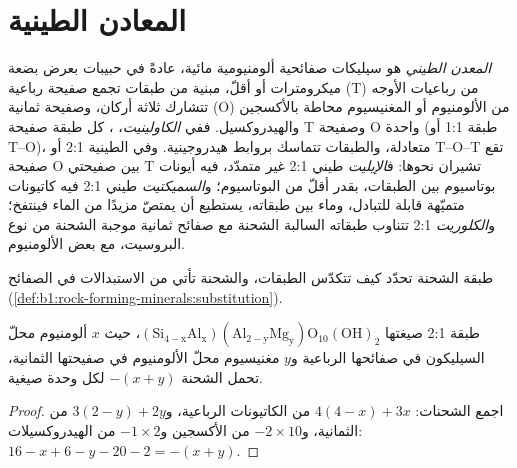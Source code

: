 \section{المعادن الطينية}\label{sec:b1:weathering-clays:clays}

\begin{definition}\label{def:b1:weathering-clays:clay-mineral}
\emph{المعدن الطيني} هو سيليكات صفائحية ألومنيومية مائية، عادةً في حبيبات بعرض بضعة ميكرومترات أو أقلّ، مبنية من طبقات تجمع صفيحة رباعية (T) من رباعيات الأوجه  تتشارك ثلاثة أركان، وصفيحة ثمانية (O) من الألومنيوم أو المغنيسيوم محاطة بالأكسجين والهيدروكسيل. ففي \emph{الكاولينيت}، ، كل طبقة صفيحة T وصفيحة O واحدة (طبقة 1:1 أو T--O)، متعادلة، والطبقات تتماسك بروابط هيدروجينية. وفي  الطينية 2:1 أو T--O--T تقع صفيحة O بين صفيحتي T تشيران نحوها: ف\emph{الإيليت}  طيني 2:1 غير متمدّد، فيه أيونات بوتاسيوم بين الطبقات،  بقدر أقلّ من البوتاسيوم؛ و\emph{السميكتيت}  طيني 2:1 فيه كاتيونات متميّهة قابلة للتبادل، وماء بين طبقاته، يستطيع أن يمتصّ مزيدًا من الماء فينتفخ؛ و\emph{الكلوريت}  2:1 تتناوب طبقاته السالبة الشحنة مع صفائح ثمانية موجبة الشحنة من نوع البروسيت،  مع بعض الألومنيوم.
\end{definition}

طبقة الشحنة تحدّد كيف تتكدّس الطبقات، والشحنة تأتي من الاستبدالات في الصفائح (\cref{def:b1:rock-forming-minerals:substitution}).

\begin{proposition}\label{prop:b1:weathering-clays:layer-charge}
طبقة 2:1 صيغتها $\mathrm{(Si_{4-x}Al_x)(Al_{2-y}Mg_y)O_{10}(OH)_2}$، حيث $x$ ألومنيوم محلّ السيليكون في صفائحها الرباعية و$y$ مغنيسيوم محلّ الألومنيوم في صفيحتها الثمانية، تحمل الشحنة $-(x + y)$ لكل وحدة صيغية.
\end{proposition}

\begin{proof}
اجمع الشحنات: $4(4 - x) + 3x$ من الكاتيونات الرباعية، و$3(2 - y) + 2y$ من الثمانية، و$-2\times10$ من الأكسجين و$-1\times2$ من الهيدروكسيلات: $16 - x + 6 - y - 20 - 2 = -(x + y)$.
\end{proof}

